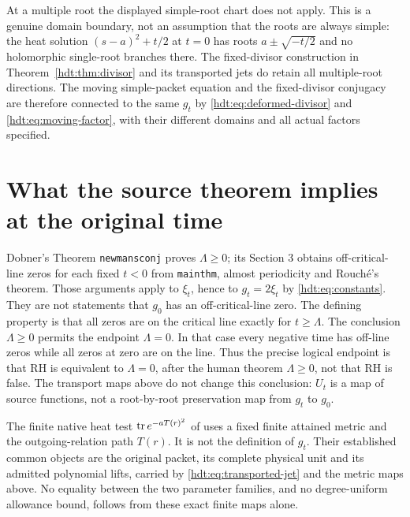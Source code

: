 \documentclass[11pt]{article}
\begin{document}
At a multiple root the displayed simple-root chart does not apply.
This is a genuine domain boundary, not an assumption that the roots
are always simple: the heat solution $(s-a)^2+t/2$ at $t=0$ has
roots $a\pm\sqrt{-t/2}$ and no holomorphic single-root branches
there. The fixed-divisor construction in
Theorem~\ref{hdt:thm:divisor} and its transported jets do retain all
multiple-root directions. The moving simple-packet equation and the
fixed-divisor conjugacy are therefore connected to the same $g_t$
by \eqref{hdt:eq:deformed-divisor} and \eqref{hdt:eq:moving-factor}, with
their different domains and all actual factors specified.

\section{What the source theorem implies at the original time}

Dobner's Theorem \texttt{newmansconj} proves $\Lambda\geq0$;
its Section 3 obtains off-critical-line zeros for each fixed $t<0$
from \texttt{mainthm}, almost periodicity and Rouch\'e's theorem.
Those arguments apply to $\xi_t$, hence to $g_t=2\xi_t$ by
\eqref{hdt:eq:constants}. They are not statements that $g_0$ has an
off-critical-line zero. The defining property is that all zeros
are on the critical line exactly for $t\geq\Lambda$.
The conclusion $\Lambda\geq0$ permits the endpoint $\Lambda=0$.
In that case every negative time has off-line zeros while all
zeros at zero are on the line. Thus the precise logical endpoint
is that RH is equivalent to $\Lambda=0$, after the human theorem
$\Lambda\geq0$, not that RH is false. The transport maps above
do not change this conclusion: $U_t$ is a map of source functions,
not a root-by-root preservation map from $g_t$ to $g_0$.

The finite native heat test $\operatorname{tr} e^{-aT(r)^2}$ of \cite{hdt:Native}
uses a fixed finite attained metric and the outgoing-relation path
$T(r)$. It is not the definition of $g_t$. Their established common
objects are the original packet, its complete physical unit and its
admitted polynomial lifts, carried by
\eqref{hdt:eq:transported-jet} and the metric maps above. No equality
between the two parameter families, and no degree-uniform allowance
bound, follows from these exact finite maps alone.
\end{document}
